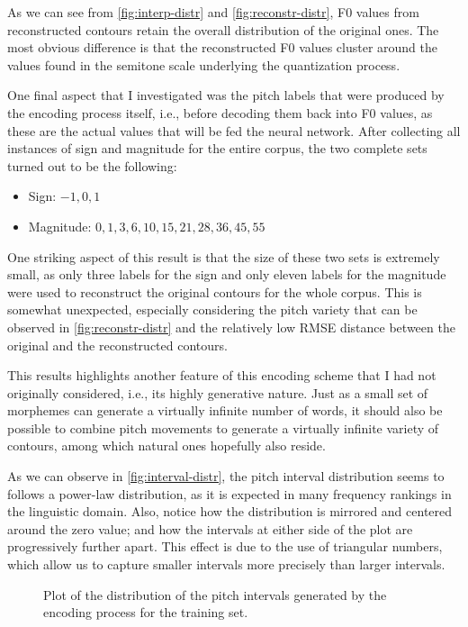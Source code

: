 As we can see from \autoref{fig:interp-distr} and \autoref{fig:reconstr-distr},
\ac{F0} values from reconstructed contours retain the overall distribution of the original ones. 
The most obvious difference is that the reconstructed \ac{F0} values cluster around the values found in the semitone scale underlying the quantization process. 

One final aspect that I investigated was the pitch labels that were produced by the encoding process itself, i.e., before decoding them back into \ac{F0} values, as these are the actual values that will be fed the neural network.
After collecting all instances of sign and magnitude for the entire corpus, the two complete sets turned out to be the following:

\begin{itemize}
  \item Sign: $-1, 0, 1$
  \item Magnitude: $0, 1, 3, 6, 10, 15, 21, 28, 36, 45, 55$
\end{itemize}

One striking aspect of this result is that the size of these two sets is extremely small, as only three labels for the sign and only eleven labels for the magnitude were used to reconstruct the original contours for the whole corpus.
This is somewhat unexpected, especially considering the pitch variety that can be observed in \autoref{fig:reconstr-distr} and the relatively low \ac{RMSE} distance between the original and the reconstructed contours.

This results highlights another feature of this encoding scheme that I had not originally considered, i.e., its highly generative nature.
Just as a small set of morphemes can generate a virtually infinite number of words, it should also be possible to combine pitch movements to generate a virtually infinite variety of contours, among which natural ones hopefully also reside.

As we can observe in \autoref{fig:interval-distr}, the pitch interval distribution seems to follows a power-law distribution, as it is expected in many frequency rankings in the linguistic domain. 
Also, notice how the distribution is mirrored and centered around the zero value; and how the intervals at either side of the plot are progressively further apart.
This effect is due to the use of triangular numbers, which allow us to capture smaller intervals more precisely than larger intervals.


\begin{figure}[h]
\centering
\resizebox{\textwidth}{!}{}
\caption[Pitch interval train distribution]{Plot of the distribution of the pitch intervals generated by the encoding process for the training set.}
\label{fig:interval-distr}
\end{figure}



